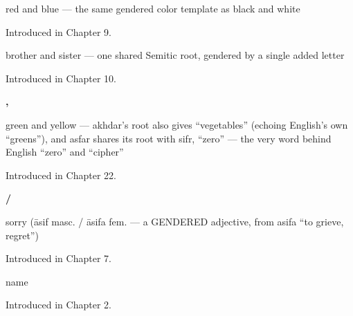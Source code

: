 \noindent\begin{minipage}[t]{\linewidth}
\raggedright
\textbf{ }\par
\small red and blue — the same gendered color template as black and white\par
\footnotesize Introduced in Chapter 9.
\end{minipage}\par\medskip

\noindent\begin{minipage}[t]{\linewidth}
\raggedright
\textbf{ }\par
\small brother and sister — one shared Semitic root, gendered by a single added letter\par
\footnotesize Introduced in Chapter 10.
\end{minipage}\par\medskip

\noindent\begin{minipage}[t]{\linewidth}
\raggedright
\textbf{, }\par
\small green and yellow — akhdar's root also gives \textquotedblleft{}vegetables\textquotedblright{} (echoing English's own \textquotedblleft{}greens\textquotedblright{}), and asfar shares its root with sifr, \textquotedblleft{}zero\textquotedblright{} — the very word behind English \textquotedblleft{}zero\textquotedblright{} and \textquotedblleft{}cipher\textquotedblright{}\par
\footnotesize Introduced in Chapter 22.
\end{minipage}\par\medskip

\noindent\begin{minipage}[t]{\linewidth}
\raggedright
\textbf{ / }\par
\small sorry (āsif masc. / āsifa fem. — a GENDERED adjective, from asifa \textquotedblleft{}to grieve, regret\textquotedblright{})\par
\footnotesize Introduced in Chapter 7.
\end{minipage}\par\medskip

\noindent\begin{minipage}[t]{\linewidth}
\raggedright
\textbf{}\par
\small name\par
\footnotesize Introduced in Chapter 2.
\end{minipage}\par\medskip

